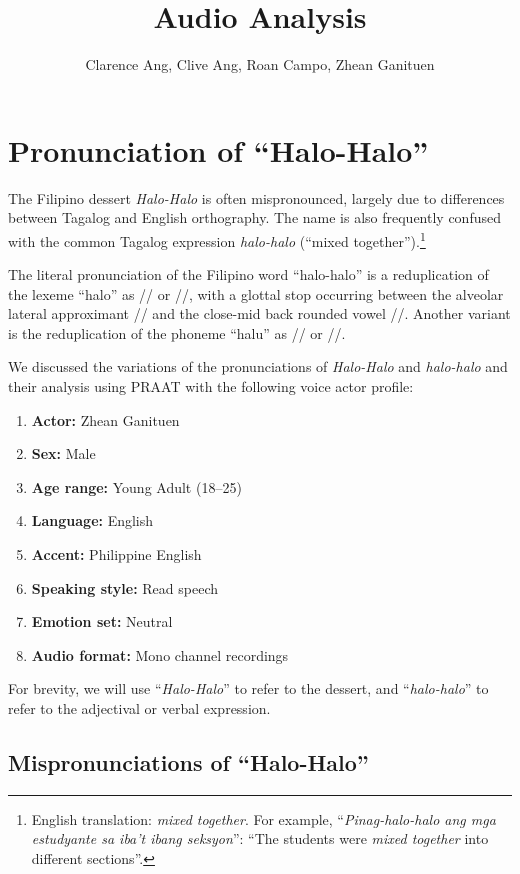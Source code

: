 \documentclass{article}
\title{Audio Analysis}
\author{   
	Clarence Ang,
	Clive Ang,
	Roan Campo,
	Zhean Ganituen
}
\begin{document}
\maketitle

\section{Pronunciation of ``Halo-Halo''}

The Filipino dessert \emph{Halo-Halo} is often mispronounced, largely due to
differences between Tagalog and English orthography. The name is also
frequently confused with the common Tagalog expression \emph{halo-halo}
(``mixed together'').\footnote{English translation: \emph{mixed together}. For
	example, ``\emph{Pinag-halo-halo ang mga estudyante sa iba't ibang seksyon}'':
	``The students were \emph{mixed together} into different sections''.}

The literal pronunciation of the Filipino word ``halo-halo'' is a reduplication
of the lexeme ``halo'' as // or //, with a glottal
stop occurring between the alveolar lateral approximant // and the
close-mid back rounded vowel //. Another variant is the
reduplication of the phoneme ``halu'' as // or //.

We discussed the variations of the pronunciations of \emph{Halo-Halo} and
\emph{halo-halo} and their analysis using PRAAT with the following voice actor
profile:

\begin{enumerate}
	\item \textbf{Actor:} Zhean Ganituen
	\item \textbf{Sex:} Male
	\item \textbf{Age range:} Young Adult (18--25)
	\item \textbf{Language:} English
	\item \textbf{Accent:} Philippine English
	\item \textbf{Speaking style:} Read speech
	\item \textbf{Emotion set:} Neutral
	\item \textbf{Audio format:} Mono channel recordings
\end{enumerate}

For brevity, we will use ``\emph{Halo-Halo}'' to refer to the dessert, and
``\emph{halo-halo}'' to refer to the adjectival or verbal expression.

\subsection{Mispronunciations of ``Halo-Halo''}
\end{document}
